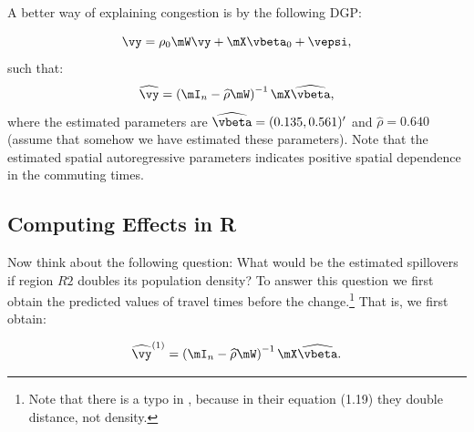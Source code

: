 \documentclass[english,12pt]{book}\usepackage[]{graphicx}\usepackage[]{xcolor}
\begin{document}
A better way of explaining congestion is by the following DGP: 

\begin{equation*}
\vy = \rho_0\mW\vy + \mX\vbeta_0 + \vepsi, 
\end{equation*}
%
such that:
\begin{equation*}
\widehat{\vy} = \left(\mI_n - \widehat{\rho}\mW\right)^{-1}\mX\widehat{\vbeta},
\end{equation*}
%
where the estimated parameters are $\widehat{\vbeta} = (0.135, 0.561)'$ and $\widehat{\rho} = 0.640$ (assume that somehow we have estimated these parameters). Note that the estimated spatial autoregressive parameters indicates positive spatial dependence in the commuting times. 

\subsection{Computing Effects in R}

Now think about the following question: What would be the estimated spillovers if region $R2$ doubles its population density? To answer this question we first obtain the predicted values of travel times before the change.\footnote{Note that there is a typo in \cite{lesage2010introduction}, because in their equation (1.19) they double distance, not density.} That is, we first obtain:

\begin{equation*}
\widehat{\vy}^{(1)} = \left(\mI_n - \widehat{\rho}\mW\right)^{-1}\mX\widehat{\vbeta}.
\end{equation*}
\end{document}
